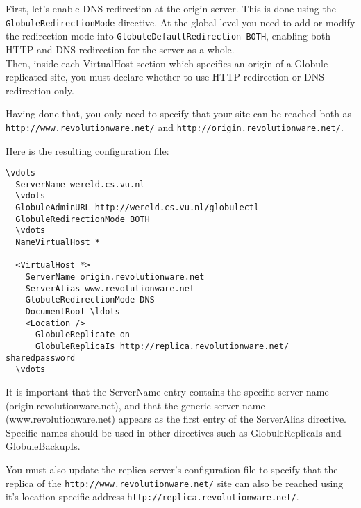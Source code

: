 \documentclass[10pt,a4paper]{article}
\makeatletter
\newenvironment{p}{\@open{P}{}}{\@close{P}}
\newenvironment{p}{}{\par}
\makeatother
\begin{document}
\begin{p}
First, let's enable DNS redirection at the origin server. This is done using
the \texttt{GlobuleRedirectionMode} directive. At the global level you need to
add or modify the redirection mode into \verb!GlobuleDefaultRedirection BOTH!,
enabling both HTTP and DNS redirection for the server as a whole. \\
Then, inside each VirtualHost section which specifies an origin of a
Globule-replicated site, you must declare whether to use HTTP redirection or
DNS redirection only.
\end{p}

\begin{p}
Having done that, you only need to specify that your site can be reached both
as \verb!http://www.revolutionware.net/! and
\verb!http://origin.revolutionware.net/!.
\end{p}

\begin{p}
Here is the resulting configuration file:
\end{p}

\begin{Verbatim}[label={New origin server's config}]
  \vdots
  ServerName wereld.cs.vu.nl
  \vdots
  GlobuleAdminURL http://wereld.cs.vu.nl/globulectl
  GlobuleRedirectionMode BOTH
  \vdots
  NameVirtualHost *

  <VirtualHost *>
    ServerName origin.revolutionware.net
    ServerAlias www.revolutionware.net
    GlobuleRedirectionMode DNS
    DocumentRoot \ldots
    <Location />
      GlobuleReplicate on
      GlobuleReplicaIs http://replica.revolutionware.net/  sharedpassword
  \vdots
\end{Verbatim}

\begin{p}
It is important that the ServerName entry contains the specific server name
(origin.revolutionware.net), and that the generic server name
(www.revolutionware.net) appears as the first entry of the ServerAlias
directive. Specific names should be used in other directives such as
GlobuleReplicaIs and GlobuleBackupIs.
\end{p}

\begin{p}
You must also update the replica server's configuration file to specify that
the replica of the \verb!http://www.revolutionware.net/!  site can also be
reached using it's location-specific address
\verb!http://replica.revolutionware.net/!.
\end{p}
\end{document}
